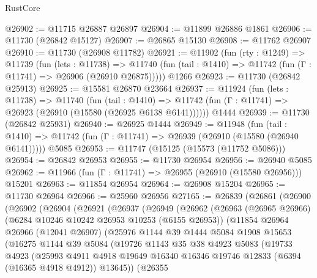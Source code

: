 \begin{lexlean}{RustCore}
\begin{coremodule}
@26902 := @11715 @26887 @26897
@26904 := @11899 @26886 @1861
@26906 := @11730 (@26842 @15127)
@26907 := @26865 @15130
@26908 := @11762 @26907
@26910 := @11730 (@26908 @11782)
@26921 := @11902
    (fun (rty : @1249) =>
    @11739
      (fun (lets : @11738) =>
      @11740 (fun (tail : @1410) => @11742 (fun (Γ : @11741) => @26906 (@26910 @26875)))))
    @1266
@26923 := @11730 (@26842 @25913)
@26925 := @15581 @26870 @23664
@26937 := @11924
    (fun (lets : @11738) =>
    @11740
      (fun (tail : @1410) =>
      @11742 (fun (Γ : @11741) => @26923 (@26910 (@15580 (@26925 @6138 @6141))))))
    @1444
@26939 := @11730 (@26842 @25931)
@26940 := @26925 @1444
@26949 := @11948
    (fun (tail : @1410) => @11742 (fun (Γ : @11741) => @26939 (@26910 (@15580 (@26940 @6141)))))
    @5085
@26953 := @11747 (@15125 (@15573 (@11752 @5086)))
@26954 := @26842 @26953
@26955 := @11730 @26954
@26956 := @26940 @5085
@26962 := @11966 (fun (Γ : @11741) => @26955 (@26910 (@15580 @26956))) @15201
@26963 := @11854 @26954
@26964 := @26908 @15204
@26965 := @11730 @26964
@26966 := @25960 @26956
@27165 := @26839
    (@26861
      (@26900
        (@26902
          (@26904
            (@26921
              (@26937
                (@26949
                  (@26962
                    (@26963
                      (@26965 @26966)
                      (@6284 @10246 @10242 @26953 @10253 (@6155 @26953))
                      (@11854
                        @26964
                        @26966
                        (@12041 @26907)
                        (@25976
                          @1144
                          @39
                          @1444
                          @5084
                          @1908
                          @15653
                          (@16275
                            @1144
                            @39
                            @5084
                            (@19726
                              @1143
                              @35
                              @38
                              @4923
                              @5083
                              (@19733
                                @4923
                                (@25993
                                  @4911
                                  @4918
                                  @19649
                                  @16340
                                  @16346
                                  @19746
                                  @12833
                                  (@6394 (@16365 @4918 @4912))
                                  @13645))
                              (@26355

\end{coremodule}
\end{lexlean}
